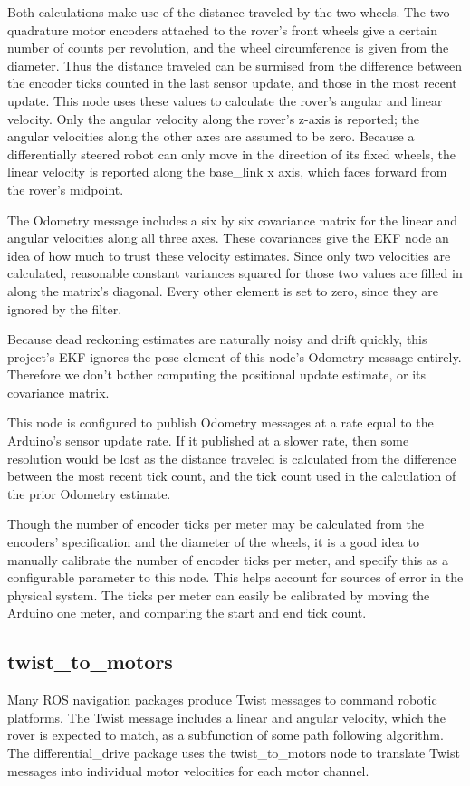 Both calculations make use of the distance traveled by the two wheels. The two quadrature motor encoders attached to the rover's front wheels give a certain number of counts per revolution, and the wheel circumference is given from the diameter. Thus the distance traveled can be surmised from the difference between the encoder ticks counted in the last sensor update, and those in the most recent update. This node uses these values to calculate the rover's angular and linear velocity. Only the angular velocity along the rover's z-axis is reported; the angular velocities along the other axes are assumed to be zero. Because a differentially steered robot can only move in the direction of its fixed wheels, the linear velocity is reported along the base\_link x axis, which faces forward from the rover's midpoint.

The Odometry message includes a six by six covariance matrix for the linear and angular velocities along all three axes. These covariances give the EKF node an idea of how much to trust these velocity estimates. Since only two velocities are calculated, reasonable constant variances squared for those two values are filled in along the matrix's diagonal. Every other element is set to zero, since they are ignored by the filter. 

Because dead reckoning estimates are naturally noisy and drift quickly, this project's EKF ignores the pose element of this node's Odometry message entirely. Therefore we don't bother computing the positional update estimate, or its covariance matrix.

This node is configured to publish Odometry messages at a rate equal to the Arduino's sensor update rate. If it published at a slower rate, then some resolution would be lost as the distance traveled is calculated from the difference between the most recent tick count, and the tick count used in the calculation of the prior Odometry estimate.

Though the number of encoder ticks per meter may be calculated from the encoders' specification and the diameter of the wheels, it is a good idea to manually calibrate the number of encoder ticks per meter, and specify this as a configurable parameter to this node. This helps account for sources of error in the physical system. The ticks per meter can easily be calibrated by moving the Arduino one meter, and comparing the start and end tick count.

\subsection{twist\_to\_motors}
Many ROS navigation packages produce Twist messages to command robotic platforms. The Twist message includes a linear and angular velocity, which the rover is expected to match, as a subfunction of some path following algorithm. The differential\_drive package uses the twist\_to\_motors node to translate Twist messages into individual motor velocities for each motor channel. 


